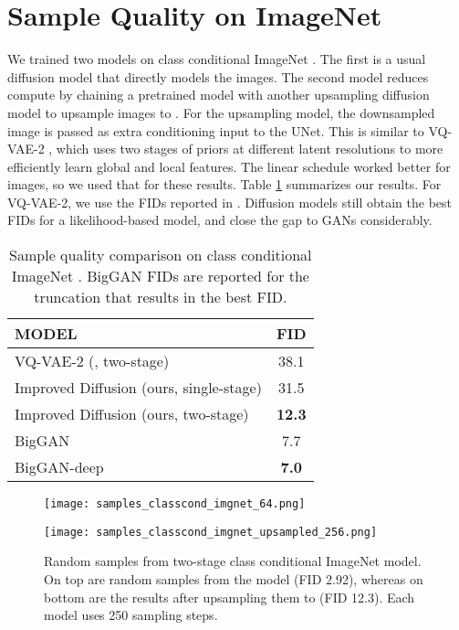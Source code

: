 \documentclass{article}
\begin{document}
\section{Sample Quality on ImageNet }
We trained two models on class conditional ImageNet . The first is a usual diffusion model that directly models the  images. The second model reduces compute by chaining a pretrained  model  with another upsampling diffusion model  to upsample images to . For the upsampling model, the downsampled image   is passed as extra conditioning input to the UNet. This is similar to VQ-VAE-2 \citep{vqvae2}, which uses two stages of priors at different latent resolutions to more efficiently learn global and local features. The linear schedule worked better for  images, so we used that for these results. Table \ref{tbl:classcond256fid} summarizes our results. For VQ-VAE-2, we use the FIDs reported in \cite{cas}. Diffusion models still obtain the best FIDs for a likelihood-based model, and close the gap to GANs considerably. 

\begin{table}[ht]
    \centering
    \begin{tabular}{l|c}
        \bf MODEL & \bf FID \\
        \hline
        VQ-VAE-2 (\cite{vqvae2}, two-stage) & 38.1 \\
        Improved Diffusion (ours, single-stage) & 31.5 \\
        Improved Diffusion (ours, two-stage) & \bf{12.3} \\ 
        BigGAN \citep{biggan} & 7.7 \\
        BigGAN-deep \citep{biggan} & \bf{7.0} \\
    \end{tabular}
    \caption{\label{tbl:classcond256fid} Sample quality comparison on class conditional ImageNet . BigGAN FIDs are reported for the truncation that results in the best FID.}
\end{table}

\begin{figure}[ht]
    \centerline{\texttt{[image: samples\_classcond\_imgnet\_64.png]}}
    \vskip 0.1in
    \centerline{\texttt{[image: samples\_classcond\_imgnet\_upsampled\_256.png]}}
    \caption{\label{fig:classcondtwostage}Random samples from two-stage class conditional ImageNet  model. On top are random samples from the  model (FID 2.92), whereas on bottom are the results after upsampling them to  (FID 12.3). Each model uses 250 sampling steps.}
    \vspace{1.5in}
\end{figure}
\end{document}
